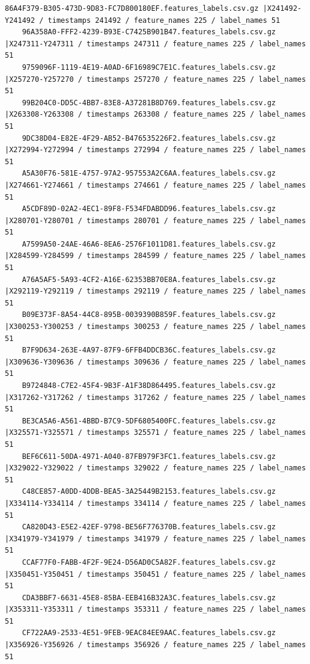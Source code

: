 \documentclass{UoNMCHA}
\numberwithin{equation}{section}
\begin{document}
\begin{lstlisting}[breaklines=true]
    86A4F379-B305-473D-9D83-FC7D800180EF.features_labels.csv.gz |X241492-Y241492 / timestamps 241492 / feature_names 225 / label_names 51
    96A358A0-FFF2-4239-B93E-C7425B901B47.features_labels.csv.gz |X247311-Y247311 / timestamps 247311 / feature_names 225 / label_names 51
    9759096F-1119-4E19-A0AD-6F16989C7E1C.features_labels.csv.gz |X257270-Y257270 / timestamps 257270 / feature_names 225 / label_names 51
    99B204C0-DD5C-4BB7-83E8-A37281B8D769.features_labels.csv.gz |X263308-Y263308 / timestamps 263308 / feature_names 225 / label_names 51
    9DC38D04-E82E-4F29-AB52-B476535226F2.features_labels.csv.gz |X272994-Y272994 / timestamps 272994 / feature_names 225 / label_names 51
    A5A30F76-581E-4757-97A2-957553A2C6AA.features_labels.csv.gz |X274661-Y274661 / timestamps 274661 / feature_names 225 / label_names 51
    A5CDF89D-02A2-4EC1-89F8-F534FDABDD96.features_labels.csv.gz |X280701-Y280701 / timestamps 280701 / feature_names 225 / label_names 51
    A7599A50-24AE-46A6-8EA6-2576F1011D81.features_labels.csv.gz |X284599-Y284599 / timestamps 284599 / feature_names 225 / label_names 51
    A76A5AF5-5A93-4CF2-A16E-62353BB70E8A.features_labels.csv.gz |X292119-Y292119 / timestamps 292119 / feature_names 225 / label_names 51
    B09E373F-8A54-44C8-895B-0039390B859F.features_labels.csv.gz |X300253-Y300253 / timestamps 300253 / feature_names 225 / label_names 51
    B7F9D634-263E-4A97-87F9-6FFB4DDCB36C.features_labels.csv.gz |X309636-Y309636 / timestamps 309636 / feature_names 225 / label_names 51
    B9724848-C7E2-45F4-9B3F-A1F38D864495.features_labels.csv.gz |X317262-Y317262 / timestamps 317262 / feature_names 225 / label_names 51
    BE3CA5A6-A561-4BBD-B7C9-5DF6805400FC.features_labels.csv.gz |X325571-Y325571 / timestamps 325571 / feature_names 225 / label_names 51
    BEF6C611-50DA-4971-A040-87FB979F3FC1.features_labels.csv.gz |X329022-Y329022 / timestamps 329022 / feature_names 225 / label_names 51
    C48CE857-A0DD-4DDB-BEA5-3A25449B2153.features_labels.csv.gz |X334114-Y334114 / timestamps 334114 / feature_names 225 / label_names 51
    CA820D43-E5E2-42EF-9798-BE56F776370B.features_labels.csv.gz |X341979-Y341979 / timestamps 341979 / feature_names 225 / label_names 51
    CCAF77F0-FABB-4F2F-9E24-D56AD0C5A82F.features_labels.csv.gz |X350451-Y350451 / timestamps 350451 / feature_names 225 / label_names 51
    CDA3BBF7-6631-45E8-85BA-EEB416B32A3C.features_labels.csv.gz |X353311-Y353311 / timestamps 353311 / feature_names 225 / label_names 51
    CF722AA9-2533-4E51-9FEB-9EAC84EE9AAC.features_labels.csv.gz |X356926-Y356926 / timestamps 356926 / feature_names 225 / label_names 51

\end{lstlisting}
\end{document}
